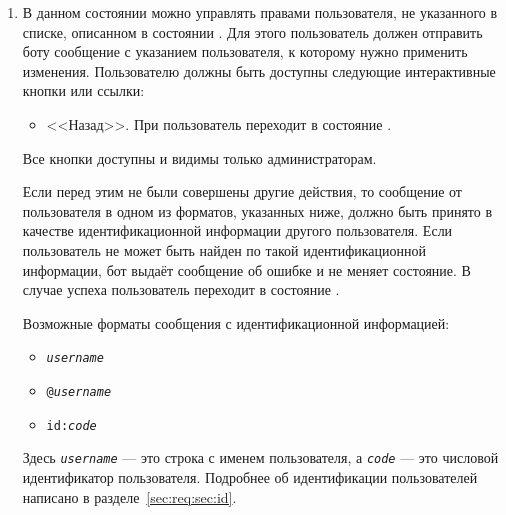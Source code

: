 \begin{enumerate}
        \item \label{itm:req:ui:states:user-privs-unlisted}

            В данном состоянии можно управлять правами пользователя, не указанного в списке,
            описанном в состоянии
            \hyperref[itm:req:ui:states:user-privs]
            {}.
            Для этого пользователь должен отправить боту сообщение с указанием пользователя,
            к которому нужно применить изменения.
            Пользователю должны быть доступны следующие интерактивные кнопки или ссылки:
            \begin{itemize}
                \item
                    <<Назад>>.
                    При  пользователь переходит в состояние
                    \hyperref[itm:req:ui:states:user-privs]
                    {}.
            \end{itemize}

            Все кнопки доступны и видимы только администраторам.

            Если перед этим не были совершены другие действия, то сообщение от пользователя
            в одном из форматов, указанных ниже, должно быть принято в качестве идентификационной
            информации другого пользователя. Если пользователь не может быть найден по такой
            идентификационной информации, бот выдаёт сообщение об ошибке и не меняет состояние.
            В случае успеха пользователь переходит в состояние
            \hyperref[itm:req:ui:states:user-privsx]
            {}.

            Возможные форматы сообщения с идентификационной информацией:
            \begin{itemize}
                \item
                    \texttt{\emph{username}}
                \item
                    \texttt{@\emph{username}}
                \item
                    \texttt{id:\emph{code}}
            \end{itemize}
            Здесь \texttt{\emph{username}} --- это строка с именем пользователя, а
            \texttt{\emph{code}} --- это числовой идентификатор пользователя. Подробнее
            об идентификации пользователей написано в разделе~\ref{sec:req:sec:id}.


\end{enumerate}

